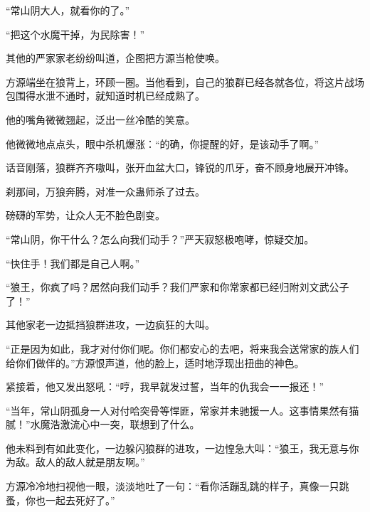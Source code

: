 \begin{this_body}
“常山阴大人，就看你的了。”

“把这个水魔干掉，为民除害！”

其他的严家家老纷纷叫道，企图把方源当枪使唤。

方源端坐在狼背上，环顾一圈。当他看到，自己的狼群已经各就各位，将这片战场包围得水泄不通时，就知道时机已经成熟了。

他的嘴角微微翘起，泛出一丝冷酷的笑意。

他微微地点点头，眼中杀机爆涨：“的确，你提醒的好，是该动手了啊。”

话音刚落，狼群齐齐嗷叫，张开血盆大口，锋锐的爪牙，奋不顾身地展开冲锋。

刹那间，万狼奔腾，对准一众蛊师杀了过去。

磅礴的军势，让众人无不脸色剧变。

“常山阴，你干什么？怎么向我们动手？”严天寂怒极咆哮，惊疑交加。

“快住手！我们都是自己人啊。”

“狼王，你疯了吗？居然向我们动手？我们严家和你常家都已经归附刘文武公子了！”

其他家老一边抵挡狼群进攻，一边疯狂的大叫。

“正是因为如此，我才对付你们呢。你们都安心的去吧，将来我会送常家的族人们给你们做伴的。”方源恨声道，他的脸上，适时地浮现出扭曲的神色。

紧接着，他又发出怒吼：“哼，我早就发过誓，当年的仇我会一一报还！”

“当年，常山阴孤身一人对付哈突骨等悍匪，常家并未驰援一人。这事情果然有猫腻！”水魔浩激流心中一突，联想到了什么。

他未料到有如此变化，一边躲闪狼群的进攻，一边惶急大叫：“狼王，我无意与你为敌。敌人的敌人就是朋友啊。”

方源冷冷地扫视他一眼，淡淡地吐了一句：“看你活蹦乱跳的样子，真像一只跳蚤，你也一起去死好了。”

\end{this_body}

